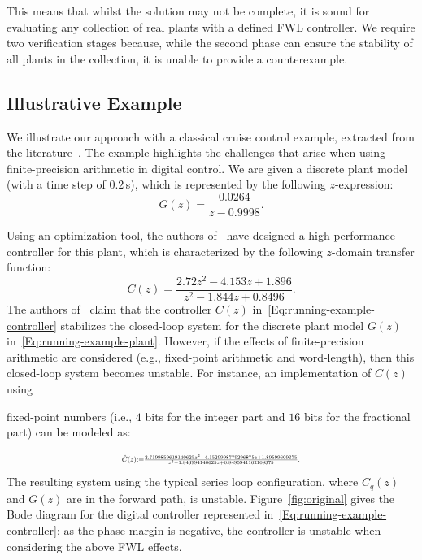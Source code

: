 \documentclass[final]{sig-alternate-05-2015}
\newcommand{\aabatecmt}[1]{}%
\begin{document}
This means that whilst the solution may not be complete, it is sound for
evaluating any collection of real plants with a defined FWL controller. 
We require two verification stages because,
while the second phase can ensure the stability of all plants in the collection, 
it is unable to provide a counterexample.

\subsection{Illustrative Example} \label{sec:running-ex}

We illustrate our approach with a classical cruise control example,
extracted from the literature~\cite{Astrom08}.  The example highlights the
challenges that arise when using finite-precision arithmetic in digital
control.  We are given a discrete plant model (with a time step of
$0.2$\,s), which is represented by the following $z$-expression:
%
\begin{equation}
\label{Eq:running-example-plant}
G(z) = \frac{0.0264}{z-0.9998}.
\end{equation}

Using an optimization tool, the authors
of~\cite{DBLP:conf/hybrid/WangGRJF16} have designed a high-performance
controller for this plant, which is characterized by the following
$z$-domain transfer function:
%
\begin{equation}
\label{Eq:running-example-controller}
C(z) = \frac{2.72z^2 - 4.153z + 1.896}{z^2 - 1.844z + 0.8496}.
\end{equation}
%
The authors of~\cite{DBLP:conf/hybrid/WangGRJF16} claim that the controller
$C(z)$ in~\eqref{Eq:running-example-controller} stabilizes the
closed-loop system for the discrete plant model $G(z)$ in~\ref{Eq:running-example-plant}.  
However, if the effects of finite-precision arithmetic are considered (e.g., fixed-point arithmetic and
word-length), then this closed-loop system becomes unstable.
%
For instance, an implementation of $C(z)$ using
\aabatecmt{[align with notation introduced earlier]} 
 fixed-point
numbers (i.e., $4$ bits for the integer part and $16$ bits for the
fractional part) can be modeled as:
%
\aabatecmt{[new notation for controller with FWL?]}
\begin{equation}
\label{Eq:running-example-controller-quantized}
\resizebox{.47\textwidth}{!}{
$\hat{C}(z) {:=} \frac{2.7199859619140625z^2{-}4.1529998779296875z
{+}1.89599609375}{z^2{-}1.843994140625z+0.8495941162109375}$. 
}
\end{equation} 
%
The resulting system using the typical series loop configuration, where
$C_{q}(z)$ and $G(z)$ are in the forward path, is unstable. 
Figure~\ref{fig:original} gives the Bode diagram for the digital controller
represented in~\eqref{Eq:running-example-controller}: 
as the phase margin is negative, 
the controller is unstable when considering the above FWL effects.
\end{document}
